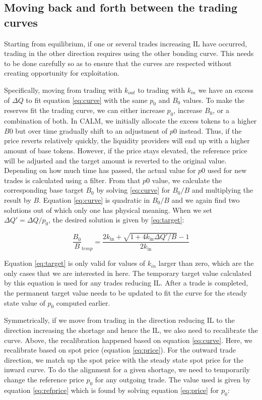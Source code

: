 \documentclass [10pt, twoside] {article}
\begin{document}
\subsection{Moving back and forth between the trading curves}
Starting from equilibrium, if one or several trades increasing IL have occurred, trading in the other direction requires using the other bonding curve. This needs to be done carefully so as to ensure that the curves are respected without creating opportunity for exploitation.

Specifically, moving from trading with $k_{out}$ to trading with $k_{in}$ we have an excess of $\Delta Q$ to fit equation \ref{eq:curve} with the same $p_0$ and $B_0$ values. To make the reserves fit the trading curve, we can either increase $p_0$, increase $B_0$, or a combination of both. In CALM, we initially allocate the excess tokens to a higher $B0$ but over time gradually shift to an adjustment of $p0$ instead. Thus, if the price reverts relatively quickly, the liquidity providers will end up with a higher amount of base tokens. However, if the price stays elevated, the reference price will be adjusted and the target amount is reverted to the original value. Depending on how much time has passed, the actual value for $p0$ used for new trades is calculated using a filter. From that $p0$ value, we calculate the corresponding base target $B_0$ by solving \ref{eq:curve} for $B_0/B$ and multiplying the result by $B$. Equation \ref{eq:curve} is quadratic in $B_0/B$ and we again find two solutions out of which only one has physical meaning. When we set $\Delta Q'=\Delta Q / p_0$, the desired solution is given by \ref{eq:target}:

\begin{equation} \label{eq:target}
	\frac{B_0}{B}_{temp} = \frac{2 k_{\text{in}} + \sqrt{1 + 4 k_{\text{in}} \Delta Q' / B} - 1}{2 k_{\text{in}}}
\end{equation}

Equation \ref{eq:target} is only valid for values of $k_{in}$ larger than zero, which are the only cases that we are interested in here. The temporary target value calculated by this equation is used for any trades reducing IL. After a trade is completed, the permanent target value needs to be updated to fit the curve for the steady state value of $p_0$ computed earlier.

Symmetrically, if we move from trading in the direction reducing IL to the direction increasing the shortage and hence the IL, we also need to recalibrate the curve. Above, the recalibration happened based on equation \ref{eq:curve}. Here, we recalibrate based on spot price (equation \ref{eq:price}). For the outward trade direction, we match up the spot price with the steady state spot price for the inward curve. To do the alignment for a given shortage, we need to temporarily change the reference price $p_0$ for any outgoing trade. The value used is given by equation \ref{eq:refprice} which is found by solving equation \ref{eq:price} for $p_0$:
\end{document}
